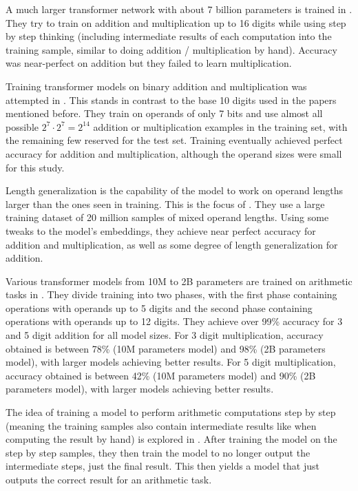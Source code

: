 A much larger transformer network with about 7 billion parameters is trained in \cite{goat}. They try to train on addition and multiplication up to 16 digits while using step by step thinking (including intermediate results of each computation into the training sample, similar to doing addition / multiplication by hand). Accuracy was near-perfect on addition but they failed to learn multiplication.

Training transformer models on binary addition and multiplication was attempted in \cite{memtocomp}. This stands in contrast to the base 10 digits used in the papers mentioned before. They train on operands of only 7 bits and use almost all possible $2^7 \cdot 2^7 = 2^{14}$ addition or multiplication examples in the training set, with the remaining few reserved for the test set. Training eventually achieved perfect accuracy for addition and multiplication, although the operand sizes were small for this study.

Length generalization is the capability of the model to work on operand lengths larger than the ones seen in training. This is the focus of \cite{rightembeddings}. They use a large training dataset of 20 million samples of mixed operand lengths. Using some tweaks to the model's embeddings, they achieve near perfect accuracy for addition and multiplication, as well as some degree of length generalization for addition.

Various transformer models from 10M to 2B parameters are trained on arithmetic tasks in \cite{nocalculator}. They divide training into two phases, with the first phase containing operations with operands up to 5 digits and the second phase containing operations with operands up to 12 digits. They achieve over 99\% accuracy for 3 and 5 digit addition for all model sizes. For 3 digit multiplication, accuracy obtained is between 78\% (10M parameters model) and 98\% (2B parameters model), with larger models achieving better results.
For 5 digit multiplication, accuracy obtained is between 42\% (10M parameters model) and 90\% (2B parameters model), with larger models achieving better results.

The idea of training a model to perform arithmetic computations step by step (meaning the training samples also contain intermediate results like when computing the result by hand) is explored in \cite{implicit}. After training the model on the step by step samples, they then train the model to no longer output the intermediate steps, just the final result. This then yields a model that just outputs the correct result for an arithmetic task.

